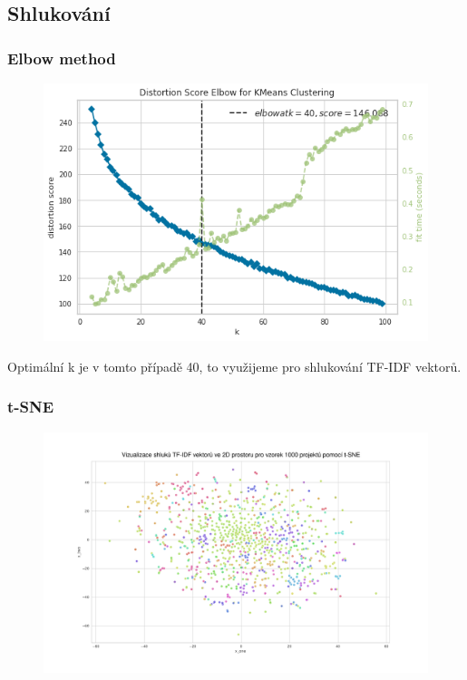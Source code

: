 \documentclass{beamer}
\begin{document}
\subsection{Shlukování}
\begin{frame}
\frametitle{Elbow method}

  \vspace{10pt}
  \begin{figure}[t]
      \centering
      \includegraphics[width=.6\textwidth,height=\textheight,keepaspectratio]{figures/elbow.png}
      \label{fig:elbow}
  \end{figure}
  
  \pause
  Optimální k je v tomto případě 40, to využijeme pro shlukování TF-IDF vektorů.
\end{frame}

\begin{frame}
  \frametitle{t-SNE}

  \begin{figure}[t]
      \centering
      \includegraphics[width=\textwidth,height=\textheight,keepaspectratio]{figures/tfidf_tsne.pdf}
      \label{fig:tsne1}
  \end{figure}
\end{frame}
\end{document}

